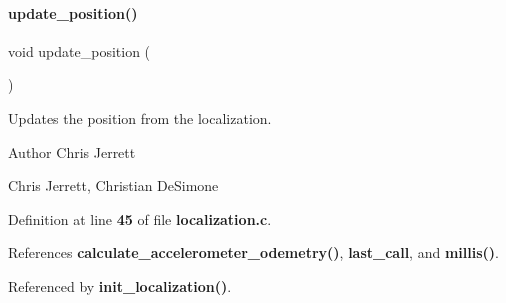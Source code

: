 \paragraph{update\+\_\+position()}
{\footnotesize\ttfamily void update\+\_\+position (\begin{DoxyParamCaption}{ }\end{DoxyParamCaption})}



Updates the position from the localization. 

\begin{DoxyAuthor}{Author}
Chris Jerrett

Chris Jerrett, Christian De\+Simone 
\end{DoxyAuthor}


Definition at line \textbf{ 45} of file \textbf{ localization.\+c}.



References \textbf{ calculate\+\_\+accelerometer\+\_\+odemetry()}, \textbf{ last\+\_\+call}, and \textbf{ millis()}.



Referenced by \textbf{ init\+\_\+localization()}.


